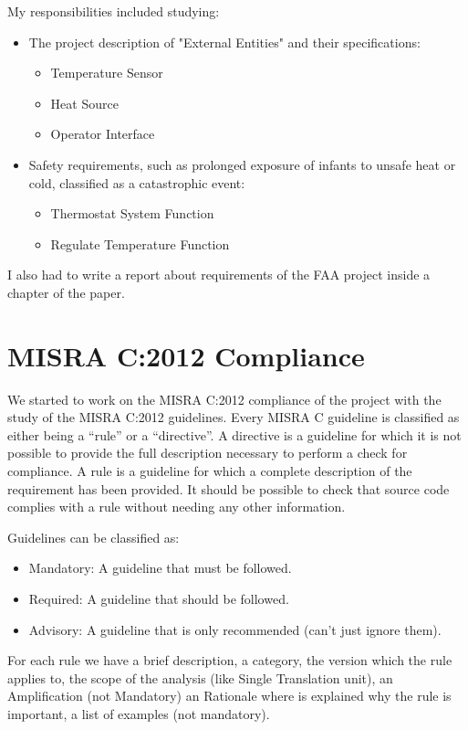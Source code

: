 \documentclass[a4paper, 12pt]{article}
\begin{document}
My responsibilities included studying:

\begin{itemize}
    \item The project description of "External Entities" and their specifications:
    \begin{itemize}
        \item Temperature Sensor
        \item Heat Source
        \item Operator Interface
    \end{itemize}
    \item Safety requirements, such as prolonged exposure of infants to unsafe heat or cold, classified as a catastrophic event:
    \begin{itemize}
        \item Thermostat System Function
        \item Regulate Temperature Function
    \end{itemize}
\end{itemize}

I also had to write a report about requirements of the FAA project inside a chapter of the paper.

\section{MISRA C:2012 Compliance}

We started to work on the MISRA C:2012 compliance of the project with the study of the MISRA C:2012 guidelines.
Every MISRA C guideline is classified as either being a “rule” or a “directive”.
A directive is a guideline for which it is not possible to provide the full description necessary to perform a check for compliance.
A rule is a guideline for which a complete description of the requirement has been provided. 
It should be possible to check that source code complies with a rule without needing any other information.

Guidelines can be classified as:
\begin{itemize}
    \item Mandatory: A guideline that must be followed.
    \item Required: A guideline that should be followed.
    \item Advisory: A guideline that is only recommended (can't just ignore them).
\end{itemize}

For each rule we have a brief description, a category, the version which the rule applies to, the scope of the analysis (like Single Translation unit), 
an Amplification (not Mandatory) an Rationale where is explained why the rule is important, a list of examples (not mandatory).
\end{document}
